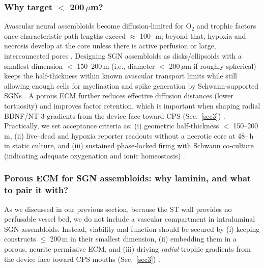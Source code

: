 \documentclass[referee,pdflatex, sn-vancouver-num]{sn-jnl}%
\theoremstyle{thmstyleone}%
\theoremstyle{thmstyletwo}%
\theoremstyle{thmstylethree}%
\DeclareRobustCommand{\textendash}{\ifmmode\text{-}\else\leavevmode\hbox{--}\fi}
\begin{document}
\subsubsection{Why target \texorpdfstring{$<$ 200\,$\mu$m}{< 200 µm}? }
Avascular neural assembloids become diffusion‑limited for O$_2$ and trophic factors once characteristic path lengths exceed $\approx$ 100\textendash200\,\textmu m; beyond that, hypoxia and necrosis develop at the core unless there is active perfusion or large, interconnected pores \citep{Grimes2014SpheroidOxygen,Rouwkema2008Vascularization,MuellerKlieser1987Spheroids}. Designing SGN assembloids as disks/ellipsoids with a smallest dimension $<$ 150–200\,\textmu m (i.e., diameter $<$ 200\,$\mu$m if roughly spherical) keeps the half‑thickness within known avascular transport limits while still allowing enough cells for myelination and spike generation by Schwann‑supported SGNs \citep{Oliveira2023FrontiersPN,Moss2024iScience}. A porous ECM further reduces effective diffusion distances (lower tortuosity) and improves factor retention, which is important when shaping radial BDNF/NT‑3 gradients from the device face toward CPS (Sec.~\ref{sec3}) \citep{SandovalCastellanos2020HeparinBDNF,Nella2022NeurotrophinGradients,Leake2013}. Practically, we set acceptance criteria as: (i) geometric half‑thickness $<$ 150–200\,\textmu m, (ii) live–dead and hypoxia reporter readouts without a necrotic core at 48\textendash 72\,h in static culture, and (iii) sustained phase‑locked firing with Schwann co‑culture (indicating adequate oxygenation and ionic homeostasis) \citep{Xia2023StemCellReports}.

\subsubsection{Porous ECM for SGN assembloids: why laminin, and what to pair it with?}
As we discussed in our previous section, because the ST wall provides no perfusable vessel bed, we do not include a vascular compartment in intraluminal SGN assembloids. Instead, viability and function should be secured by (i) keeping constructs $\leq$ 200\,\textmu m in their smallest dimension, (ii) embedding them in a porous, neurite‑permissive ECM, and (iii) driving \emph{radial} trophic gradients from the device face toward CPS mouths (Sec.~\ref{sec3}) \citep{Nella2022NeurotrophinGradients,Leake2013,Evans2009-cm,SandovalCastellanos2020HeparinBDNF}. 
\end{document}
